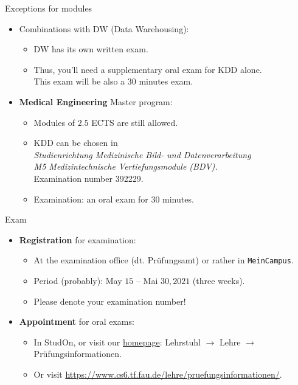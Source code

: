 \documentclass[aspectratio=169,t]{beamer}
\begin{document}
  { %
    \begin{frame}{Exceptions for modules}
      \begin{itemize}
          \item Combinations with DW (Data Warehousing):
                \begin{itemize}
                    \item DW has its own written exam.
                    \item Thus, you'll need a supplementary oral exam for KDD alone.\\
                          This exam will be also a $30$ minutes exam.
                \end{itemize}
          \item \textbf{Medical Engineering} Master program:
                \begin{itemize}
                    \item Modules of $2.5$ ECTS are still allowed.
                    \item KDD can be chosen in \\
                          \emph{Studienrichtung Medizinische Bild- und Datenverarbeitung \\ M5 Medizintechnische Vertiefungsmodule (BDV).}\\
                          Examination number 392229.
                    \item Examination: an oral exam for $30$ minutes.
                \end{itemize}
      \end{itemize}
    \end{frame}
  }

  { %
    \begin{frame}{Exam}
      \begin{itemize}
          \item \textbf{Registration} for examination:
                \begin{itemize}
                    \item At the examination office (dt. Prüfungsamt) or rather in \texttt{MeinCampus}.
                    \item Period (probably): May $15$ -- Mai $30, 2021$ (three weeks).
                    \item Please denote your examination number!
                \end{itemize}
          \item \textbf{Appointment} for oral exams:
                \begin{itemize}
                    \item In StudOn, or visit our \href{https://www.cs6.tf.fau.de/lehre/pruefungsinformationen/}{homepage}: Lehrstuhl $\rightarrow$ Lehre $\rightarrow$ Prüfungsinformationen.
                    \item Or visit \url{https://www.cs6.tf.fau.de/lehre/pruefungsinformationen/}.
                \end{itemize}
      \end{itemize}
    \end{frame}
  }
\end{document}
